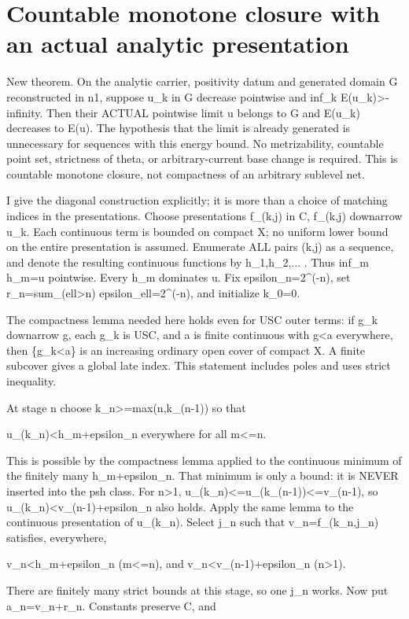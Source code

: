 \documentclass[11pt]{article}
\begin{document}
\section*{Countable monotone closure with an actual analytic presentation}

New theorem. On the analytic carrier, positivity datum and generated domain G reconstructed in n1, suppose u\_k in G decrease pointwise and inf\_k E(u\_k)>-infinity. Then their ACTUAL pointwise limit u belongs to G and E(u\_k) decreases to E(u). The hypothesis that the limit is already generated is unnecessary for sequences with this energy bound. No metrizability, countable point set, strictness of theta, or arbitrary-current base change is required. This is countable monotone closure, not compactness of an arbitrary sublevel net.

I give the diagonal construction explicitly; it is more than a choice of matching indices in the presentations. Choose presentations f\_(k,j) in C, f\_(k,j) downarrow u\_k. Each continuous term is bounded on compact X; no uniform lower bound on the entire presentation is assumed. Enumerate ALL pairs (k,j) as a sequence, and denote the resulting continuous functions by h\_1,h\_2,... . Thus inf\_m h\_m=u pointwise. Every h\_m dominates u. Fix epsilon\_n=2\textasciicircum{}(-n), set r\_n=sum\_(ell>n) epsilon\_ell=2\textasciicircum{}(-n), and initialize k\_0=0.

The compactness lemma needed here holds even for USC outer terms: if g\_k downarrow g, each g\_k is USC, and a is finite continuous with g<a everywhere, then \{g\_k<a\} is an increasing ordinary open cover of compact X. A finite subcover gives a global late index. This statement includes poles and uses strict inequality.

At stage n choose k\_n>=max(n,k\_(n-1)) so that

u\_(k\_n)<h\_m+epsilon\_n everywhere for all m<=n.

This is possible by the compactness lemma applied to the continuous minimum of the finitely many h\_m+epsilon\_n. That minimum is only a bound: it is NEVER inserted into the psh class. For n>1, u\_(k\_n)<=u\_(k\_(n-1))<=v\_(n-1), so u\_(k\_n)<v\_(n-1)+epsilon\_n also holds. Apply the same lemma to the continuous presentation of u\_(k\_n). Select j\_n such that v\_n=f\_(k\_n,j\_n) satisfies, everywhere,

v\_n<h\_m+epsilon\_n (m<=n), and v\_n<v\_(n-1)+epsilon\_n (n>1).

There are finitely many strict bounds at this stage, so one j\_n works. Now put a\_n=v\_n+r\_n. Constants preserve C, and
\end{document}
